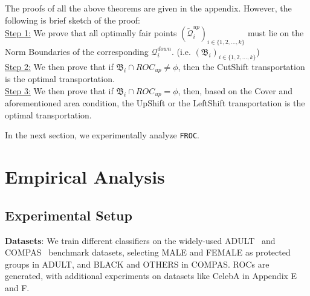 \documentclass{article}
\newcommand{\sg}[1]{ \textcolor{brown}{{\bf SG: }{``\em #1''}}}
\newcommand{\ouralgo}{\texttt{FROC}}
\begin{document}
The proofs of all the above theorems are given in the appendix.
However, the following is brief sketch of the proof:\\
\underline{Step 1:} We prove that all optimally fair points $(\widetilde{\mathcal{Q}}_{i}^{up})_{i \in \{ 1 ,2 , \hdots , k\}}$ must lie on the Norm Boundaries of the corresponding $\mathcal{Q}_i^{down}$. (i.e. $(\mathfrak{B}_i)_{i \in\{ 1 ,2 , \hdots , k\} }$)\\
\underline{Step 2:} We then prove that if $\mathfrak{B}_i \cap ROC_{up} \neq \phi $, then the CutShift transportation is the optimal transportation.\\
\underline{Step 3:} We then prove that if $\mathfrak{B}_i \cap ROC_{up} = \phi $, then, based on the Cover and aforementioned area condition, the UpShift or the LeftShift transportation is the optimal transportation.


In the next section, we experimentally analyze \ouralgo. 
\section{Empirical Analysis}
\subsection{Experimental Setup}
\noindent \textbf{Datasets}: 
We train different classifiers on the widely-used ADULT~\cite{misc_adult_2} and COMPAS~\cite{angwin2016machine} benchmark datasets, selecting MALE and FEMALE as protected groups in ADULT, and BLACK and OTHERS in COMPAS. ROCs are generated, with additional experiments on datasets like CelebA in Appendix E and F.
\end{document}
